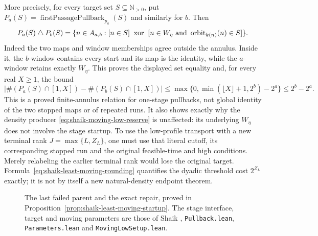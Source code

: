\documentclass[11pt]{article}
\theoremstyle{remark}\newtheorem{remark}[proposition]{Remark}
\begin{document}
More precisely, for every target set \(S\subseteq\mathbb N_{>0}\),
put \(P_a(S)=\operatorname{firstPassagePullback}_{p_a}(S)\)
and similarly for \(b\). Then
\begin{equation}\label{eq:shaik-startup-pullback-difference}
 P_a(S)\mathbin{\triangle}P_b(S)
 =\{n\in A_{a,b}:
 [n\in S]\ \mathbin{\mathrm{xor}}\
 [n\in W_\eta\ \hbox{and}\ \operatorname{orbit}_{k(n)}(n)\in S]\}.
\end{equation}
Indeed the two maps and window memberships agree outside the
annulus. Inside it, the \(b\)-window contains every start and its
map is the identity, while the \(a\)-window retains exactly
\(W_\eta\). This proves the displayed set equality and, for every
real \(X\ge1\), the bound
\[
 \left|\#(P_a(S)\cap[1,X])-\#(P_b(S)\cap[1,X])\right|
 \le \max\{0,\min(\lfloor X\rfloor+1,2^b)-2^a\}
 \le 2^b-2^a.
\]
This is a proved finite-annulus relation for one-stage pullbacks,
not global identity of the two stopped maps or of repeated runs.
It also shows exactly why the density producer
\eqref{eq:shaik-moving-low-reserve} is unaffected:
its underlying \(W_\eta\) does not involve the stage startup.
To use the low-profile transport with a new terminal rank
\(J=\max\{L,Z_L\}\), one must use that literal cutoff, its
corresponding stopped run and the original feasible-time and high
conditions. Merely relabeling the earlier terminal rank would
lose the original target. Formula~\eqref{eq:shaik-least-moving-rounding}
quantifies the dyadic threshold cost \(2^{Z_L}\) exactly;
it is not by itself a new natural-density endpoint theorem.

\begin{figure}[ht]
\centering
{}
\caption{The last failed parent and the exact repair, proved in
Proposition~\ref{prop:shaik-least-moving-startup}.
The stage interface, target and moving parameters are those of
Shaik \cite{Shaik2026v324}, \texttt{Pullback.lean},
\texttt{Parameters.lean} and \texttt{MovingLowSetup.lean}.}
\end{figure}
\end{document}
